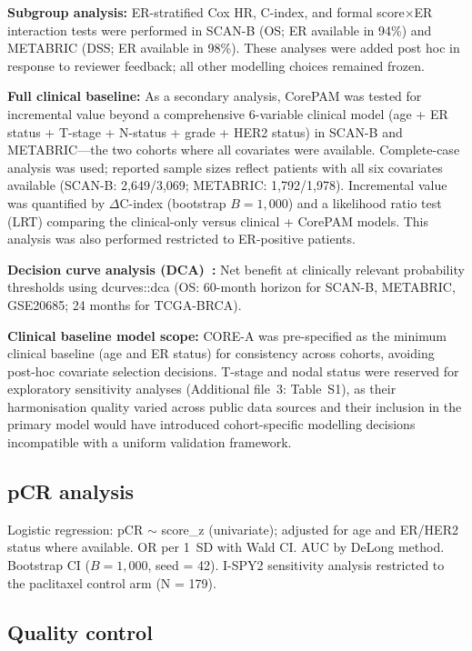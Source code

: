 \documentclass[pdflatex,sn-vancouver-num]{sn-jnl}
\begin{document}
\textbf{Subgroup analysis:} ER-stratified Cox HR, C-index, and formal score$\times$ER interaction tests were performed in SCAN-B (OS; ER available in 94\%) and METABRIC (DSS; ER available in 98\%). These analyses were added post hoc in response to reviewer feedback; all other modelling choices remained frozen.

\textbf{Full clinical baseline:} As a secondary analysis, CorePAM was tested for incremental value beyond a comprehensive 6-variable clinical model (age + ER status + T-stage + N-status + grade + HER2 status) in SCAN-B and METABRIC---the two cohorts where all covariates were available. Complete-case analysis was used; reported sample sizes reflect patients with all six covariates available (SCAN-B: 2,649/3,069; METABRIC: 1,792/1,978). Incremental value was quantified by $\Delta$C-index (bootstrap $B = 1{,}000$) and a likelihood ratio test (LRT) comparing the clinical-only versus clinical + CorePAM models. This analysis was also performed restricted to ER-positive patients.

\textbf{Decision curve analysis (DCA)~\cite{vickers2006}:} Net benefit at clinically relevant probability thresholds using dcurves::dca (OS: 60-month horizon for SCAN-B, METABRIC, GSE20685; 24 months for TCGA-BRCA).

\textbf{Clinical baseline model scope:} CORE-A was pre-specified as the minimum clinical baseline (age and ER status) for consistency across cohorts, avoiding post-hoc covariate selection decisions. T-stage and nodal status were reserved for exploratory sensitivity analyses (Additional file~3: Table~S1), as their harmonisation quality varied across public data sources and their inclusion in the primary model would have introduced cohort-specific modelling decisions incompatible with a uniform validation framework.

\subsection{pCR analysis}\label{subsec:pcr-analysis}

Logistic regression: pCR $\sim$ score\_z (univariate); adjusted for age and ER/HER2 status where available. OR per 1~SD with Wald CI. AUC by DeLong method. Bootstrap CI ($B = 1{,}000$, seed = 42). I-SPY2 sensitivity analysis restricted to the paclitaxel control arm (N = 179).

\subsection{Quality control}\label{subsec:quality-control}
\end{document}
